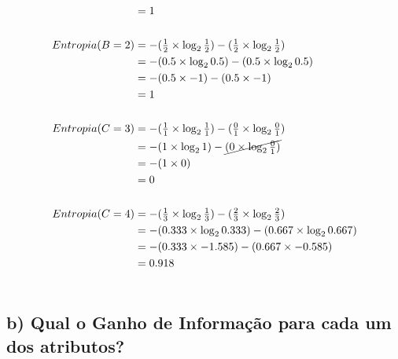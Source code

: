 \documentclass[
    article,            %
    11pt,               %
    oneside,            %
    a4paper,            %
    english,            %
    brazil,             %
    sumario=tradicional,
    ]{abntex2}
\begin{document}
\begin{align*}
              &= 1                                                                                     \\\\
Entropia(B=2) &= - (\tfrac{1}{2} \times \log_2 \tfrac{1}{2}) - (\tfrac{1}{2} \times \log_2 \tfrac{1}{2}) \\ 
              &= - (0.5 \times \log_2 0.5) - (0.5 \times \log_2 0.5)                                     \\
              &= - (0.5 \times -1) - (0.5 \times -1)                                                     \\
              &= 1                                                                                     \\\\
Entropia(C=3) &= - (\tfrac{1}{1} \times \log_2 \tfrac{1}{1}) - (\tfrac{0}{1} \times \log_2 \tfrac{0}{1}) \\ 
              &= - (1 \times \log_2 1) - \cancel{(0 \times \log_2 \tfrac{0}{1})}                         \\
              &= - (1 \times 0)                                                                          \\
              &= 0                                                                                     \\\\
Entropia(C=4) &= - (\tfrac{1}{3} \times \log_2 \tfrac{1}{3}) - (\tfrac{2}{3} \times \log_2 \tfrac{2}{3}) \\ 
              &= - (0.333 \times \log_2 0.333) - (0.667 \times \log_2 0.667)                             \\
              &= - (0.333 \times -1.585) - (0.667 \times -0.585)                                         \\
              &= 0.918                                                                                 \\\\
\end{align*}

\subsection*{\textbf{b) Qual o Ganho de Informação para cada um dos atributos?}}
\end{document}
